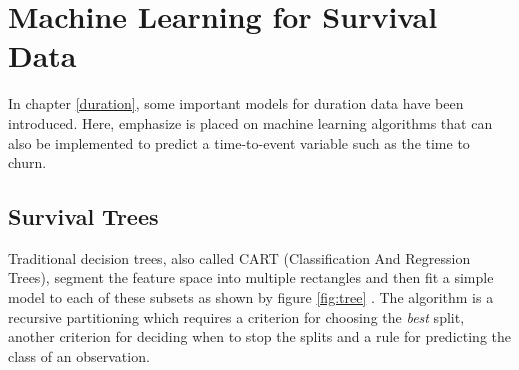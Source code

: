 \documentclass[
]{book}
\begin{document}
\hypertarget{machine-learning-for-survival-data}{%
\section{Machine Learning for Survival Data}\label{machine-learning-for-survival-data}}

In chapter \ref{duration}, some important models for duration data have been introduced. Here, emphasize is placed on machine learning algorithms that can also be implemented to predict a time-to-event variable such as the time to churn.

\hypertarget{survival-trees}{%
\subsection{Survival Trees}\label{survival-trees}}

Traditional decision trees, also called CART (Classification And Regression Trees), segment the feature space into multiple rectangles and then fit a simple model to each of these subsets as shown by figure \ref{fig:tree} \citep{ML_TREE}. The algorithm is a recursive partitioning which requires a criterion for choosing the \emph{best} split, another criterion for deciding when to stop the splits and a rule for predicting the class of an observation.
\end{document}
